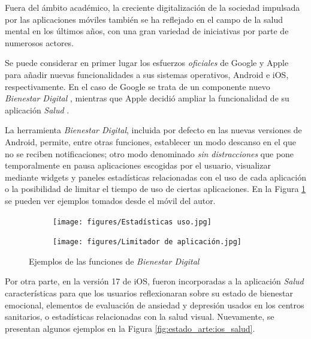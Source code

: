        Fuera del ámbito académico, la creciente digitalización de la sociedad impulsada por las aplicaciones móviles también se ha reflejado en el campo de la salud mental en los últimos años, con una gran variedad de iniciativas por parte de numerosos actores.

        Se puede considerar en primer lugar los esfuerzos \textit{oficiales} de Google y Apple para añadir nuevas funcionalidades a sus sistemas operativos, Android e iOS, respectivamente. En el caso de Google se trata de un componente nuevo \textit{Bienestar Digital} \cite{android_bienestar_nodate}, mientras que Apple decidió ampliar la funcionalidad de su aplicación \textit{Salud} \cite{apple_newsroom_apple_2023}.
        
        La herramienta \textit{Bienestar Digital}, incluida por defecto en las nuevas versiones de Android, permite, entre otras funciones, establecer un modo descanso en el que no se reciben notificaciones; otro modo denominado \textit{sin distracciones} que pone temporalmente en pausa aplicaciones escogidas por el usuario, visualizar mediante \glspl{widget} y paneles estadísticas relacionadas con el uso de cada aplicación o la posibilidad de limitar el tiempo de uso de ciertas aplicaciones. En la Figura \ref{fig:estado_arte:bienestar_digital} se pueden ver ejemplos tomados desde el móvil del autor.

        \begin{figure}[h]
            \begin{subfigure}[t]{0.48\textwidth}
                \texttt{[image: figures/Estadísticas uso.jpg]}
            \end{subfigure}
            \hfill
            \begin{subfigure}[t]{0.49\textwidth}
                \texttt{[image: figures/Limitador de aplicación.jpg]}
            \end{subfigure}
            \caption{Ejemplos de las funciones de \textit{Bienestar Digital}}
            \label{fig:estado_arte:bienestar_digital}
        \end{figure}

        Por otra parte, en la versión 17 de iOS, fueron incorporadas a la aplicación \textit{Salud} características para que los usuarios reflexionaran sobre su estado de bienestar emocional, elementos de evaluación de ansiedad y depresión usados en los centros sanitarios, o estadísticas relacionadas con la salud visual. Nuevamente, se presentan algunos ejemplos en la Figura \ref{fig:estado_arte:ios_salud}.

